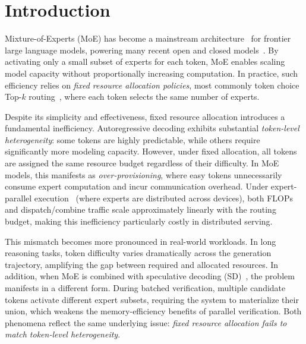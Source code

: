 \documentclass[conference]{IEEEtran}
\theoremstyle{definition} %
\begin{document}
\section{Introduction} \label{sec:introduction}

Mixture-of-Experts (MoE) has become a mainstream architecture~\cite{shazeer2017outrageously,fedus2022switch,lepikhin2020gshard,jiang2024mixtral,dai2024deepseekmoe,sun2024hunyuan} for frontier large language models, powering many recent open and closed models~\cite{comanici2025gemini,liu2024deepseek,yang2025qwen3,achiam2023gpt,team2025kimi,zeng2025glm,chowdhery2023palm}. By activating only a small subset of experts for each token, MoE enables scaling model capacity without proportionally increasing computation. In practice, such efficiency relies on \emph{fixed resource allocation policies}, most commonly token choice Top-$k$ routing~\cite{lepikhin2020gshard}, where each token selects the same number of experts.

Despite its simplicity and effectiveness, fixed resource allocation introduces a fundamental inefficiency. 
Autoregressive decoding exhibits substantial \emph{token-level heterogeneity}: some tokens are highly predictable, while others require significantly more modeling capacity. 
However, under fixed allocation, all tokens are assigned the same resource budget regardless of their difficulty. 
In MoE models, this manifests as \emph{over-provisioning}, where easy tokens unnecessarily consume expert computation and incur communication overhead. 
Under expert-parallel execution~\cite{lepikhin2020gshard} (where experts are distributed across devices), both FLOPs and dispatch/combine traffic scale approximately linearly with the routing budget, making this inefficiency particularly costly in distributed serving.

This mismatch becomes more pronounced in real-world workloads. 
In long reasoning tasks, token difficulty varies dramatically across the generation trajectory, amplifying the gap between required and allocated resources. 
In addition, when MoE is combined with speculative decoding (SD)~\cite{leviathan2023spec,chen2023spec}, the problem manifests in a different form. 
During batched verification, multiple candidate tokens activate different expert subsets, requiring the system to materialize their union, which weakens the memory-efficiency benefits of parallel verification. 
Both phenomena reflect the same underlying issue: \emph{fixed resource allocation fails to match token-level heterogeneity}.
\end{document}
